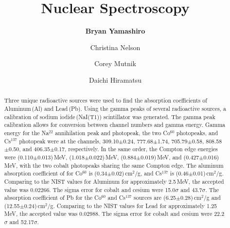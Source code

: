\documentclass[aps,prl,twocolumn,superscriptaddress,nofootinbib]{revtex4-1}
\begin{document}





\title{Nuclear Spectroscopy}


\author{\textbf{Bryan Yamashiro}}
\author{Christina Nelson}
\author{Corey Mutnik}
\author{Daichi Hiramatsu}






\begin{abstract}

Three unique radioactive sources were used to find the absorption coefficients of Aluminum\,(Al) and Lead\,(Pb). Using the gamma peaks of several radioactive sources, a calibration of sodium iodide\,(NaI(T1)) scintillator was generated. The gamma peak calibration allows for conversion between channel numbers and gamma energy. Gamma energy for the Na$^{22}$ annihilation peak and photopeak, the two Co$^{60}$ photopeaks, and Cs$^{137}$ photopeak were at the channels, 309.10$\pm$0.24, 777.68$\pm$1.74, 705.79$\pm$0.58, 808.58$\pm$0.50, and 406.35$\pm$0.17, respectively. In the same order, the Compton edge energies were (0.110$\pm$0.013)\,MeV, (1.018$\pm$0.022)\,MeV, (0.884$\pm$0.019)\,MeV, and (0.427$\pm$0.016)\,MeV, with the two cobalt photopeaks sharing the same Compton edge. The aluminum absorption coefficient of for Co$^60$ is (0.34$\pm$0.02)\,cm$^{2}$/g, and Cs$^137$ is (0.46$\pm$0.01)\,cm$^{2}$/g. Comparing to the NIST values for Aluminum for approximately 2.5\,MeV, the accepted value was 0.02266. The sigma error for cobalt and cesium were 15.0$\sigma$ and 43.7$\sigma$. The absorption coefficient of Pb for the Co$^{60}$ and Cs$^{137}$ sources are (6.25$\pm$0.28)\,cm$^{2}$/g and (12.55$\pm$0.24)\,cm$^{2}$/g. Comparing to the NIST values for Lead for approximately 1.25\,MeV, the accepted value was 0.02988. The sigma error for cobalt and cesium were 22.2$\sigma$ and 52.17$\sigma$.


\end{abstract}
\end{document}
